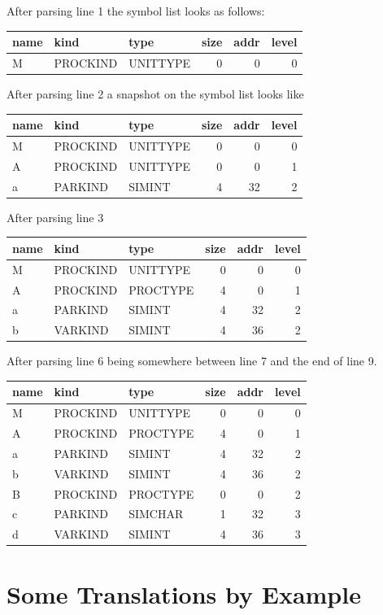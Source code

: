 \documentclass[11pt]{report}
\begin{document}
After parsing line 1 the symbol list looks as follows:

\begin{tabular}{lllrrr}
name & kind & type & size & addr & level \\
\hline
M & PROCKIND & UNITTYPE & 0 & 0 & 0
\end{tabular}

After parsing line 2 a snapshot on the symbol list looks like

\begin{tabular}{lllrrr}
name & kind & type & size & addr & level \\
\hline
M & PROCKIND & UNITTYPE & 0 & 0 & 0 \\
A & PROCKIND & UNITTYPE & 0 & 0 & 1 \\
a & PARKIND & SIMINT & 4 & 32 & 2
\end{tabular}

After parsing line 3

\begin{tabular}{lllrrr}
name & kind & type & size & addr & level \\
\hline
M & PROCKIND & UNITTYPE & 0 & 0 & 0 \\
A & PROCKIND & PROCTYPE & 4 & 0 & 1 \\
a & PARKIND & SIMINT & 4 & 32 & 2 \\
b & VARKIND & SIMINT & 4 & 36 & 2
\end{tabular}

After parsing line 6 being somewhere between line 7 and the end of line 9.

\begin{tabular}{lllrrr}
name & kind & type & size & addr & level \\
\hline
M & PROCKIND & UNITTYPE & 0 & 0 & 0 \\
A & PROCKIND & PROCTYPE & 4 & 0 & 1 \\
a & PARKIND & SIMINT & 4 & 32 & 2 \\
b & VARKIND & SIMINT & 4 & 36 & 2 \\
B & PROCKIND & PROCTYPE & 0 & 0 & 2 \\
c & PARKIND & SIMCHAR & 1 & 32 & 3 \\
d & VARKIND & SIMINT & 4 & 36 & 3
\end{tabular}



\chapter{Some Translations by Example}
\end{document}
